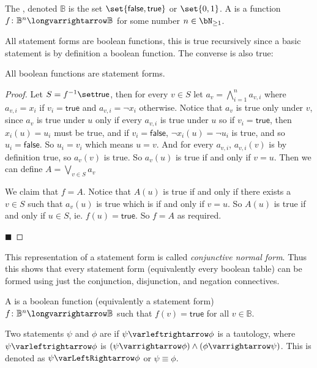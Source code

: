 \documentclass[10pt]{article}
\let\eiff=\varLeftRightarrow
\def\mB{\mathbb{B}}
\def\true{\mathsf{true}}
\def\false{\mathsf{false}}
\begin{document}
\begin{defn*}

    The , denoted $\mB$ is the set $\set{\false,\true}$ or $\set{0,1}$.
    A  is a function $f\colon\mB^n\longvarrightarrow\mB$ for some number $n\in\bN_{\geq1}$.

\end{defn*}

All statement forms are boolean functions, this is true recursively since a basic statement is by definition a boolean function.
The converse is also true:

\begin{prop*}

    All boolean functions are statement forms.

\end{prop*}

\begin{proof}

    Let $S=f^{-1}\set\true$, then for every $v\in S$ let $a_v=\bigwedge_{i=1}^n a_{v,i}$ where $a_{v,i}=x_i$ if $v_i=\true$ and $a_{v,i}=\neg x_i$ otherwise.
    Notice that $a_v$ is true only under $v$, since $a_v$ is true under $u$ only if every $a_{v,i}$ is true under $u$ so if $v_i=\true$, then $x_i(u)=u_i$ must be true, and if $v_i=\false$,
    $\neg x_i(u)=\neg u_i$ is true, and so $u_i=\false$.
    So $u_i=v_i$ which means $u=v$.
    And for every $a_{v,i}$, $a_{v,i}(v)$ is by definition true, so $a_v(v)$ is true.
    So $a_v(u)$ is true if and only if $v=u$.
    Then we can define $A=\bigvee_{v\in S} a_v$

    We claim that $f=A$.
    Notice that $A(u)$ is true if and only if there exists a $v\in S$ such that $a_v(u)$ is true which is if and only if $v=u$.
    So $A(u)$ is true if and only if $u\in S$, ie. $f(u)=\true$.
    So $f=A$ as required.

    \hfill$\blacksquare$

\end{proof}

This representation of a statement form is called \emph{conjunctive normal form}.
Thus this shows that every statement form (equivalently every boolean table) can be formed using just the conjunction, disjunction, and negation connectives.

\begin{defn*}

    A  is a boolean function (equivalently a statement form) $f\colon\mB^n\longvarrightarrow\mB$ such that $f(v)=\true$ for all $v\in\mB$.

    Two statements $\psi$ and $\phi$ are  if $\psi\varleftrightarrow\phi$ is a tautology, where $\psi\varleftrightarrow\phi$ is $(\psi\varrightarrow\phi)\land(\phi\varrightarrow\psi)$.
    This is denoted as $\psi\eiff\phi$ or $\psi\equiv\phi$.

\end{defn*}
\end{document}
